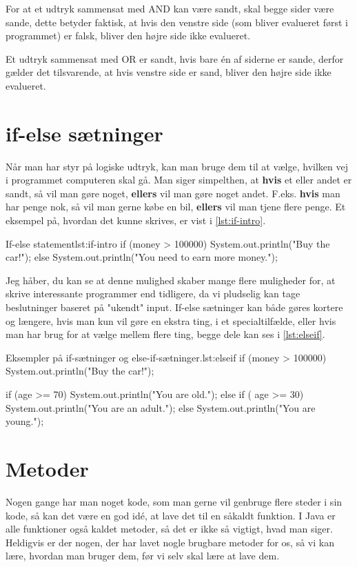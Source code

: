 {\begin{remark}
	For at et udtryk sammensat med AND kan være sandt, skal begge sider være sande, dette betyder faktisk, at hvis den venstre side (som bliver evalueret først i programmet) er falsk, bliver den højre side ikke evalueret.
	
	Et udtryk sammensat med OR er sandt, hvis bare én af siderne er sande, derfor gælder det tilsvarende, at hvis venstre side er sand, bliver den højre side ikke evalueret.
\end{remark}

\section{if-else sætninger}
Når man har styr på logiske udtryk, kan man bruge dem til at vælge, hvilken vej i programmet computeren skal gå. Man siger simpelthen, at \textbf{hvis} et eller andet er sandt, så vil man gøre noget, \textbf{ellers} vil man gøre noget andet. F.eks. \textbf{hvis} man har penge nok, så vil man gerne købe en bil, \textbf{ellers} vil man tjene flere penge. Et eksempel på, hvordan det kunne skrives, er vist i \autoref{lst:if-intro}.

\begin{JavaCode}{If-else statement}{lst:if-intro}
	if (money > 100000) {
		System.out.println("Buy the car!");
	} else {
		System.out.println("You need to earn more money.");
	}
\end{JavaCode}

Jeg håber, du kan se at denne mulighed skaber mange flere muligheder for, at skrive interessante programmer end tidligere, da vi pludselig kan tage beslutninger baseret på "ukendt" input. If-else sætninger kan både gøres kortere og længere, hvis man kun vil gøre en ekstra ting, i et specialtilfælde, eller hvis man har brug for at vælge mellem flere ting, begge dele kan ses i \autoref{lst:elseif}.

\begin{JavaCode}{Eksempler på if-sætninger og else-if-sætninger.}{lst:elseif}
	if (money > 100000) {
		System.out.println("Buy the car!");
	}
	
	if (age >= 70) {
		System.out.println("You are old.");
	} else if ( age >= 30) {
		System.out.println("You are an adult.");
	} else {
		System.out.println("You are young.");
	}
\end{JavaCode}

\section{Metoder}
Nogen gange har man noget kode, som man gerne vil genbruge flere steder i sin kode, så kan det være en god idé, at lave det til en såkaldt funktion. I Java er alle funktioner også kaldet metoder, så det er ikke så vigtigt, hvad man siger. Heldigvis er der nogen, der har lavet nogle brugbare metoder for os, så vi kan lære, hvordan man bruger dem, før vi selv skal lære at lave dem. 

}
